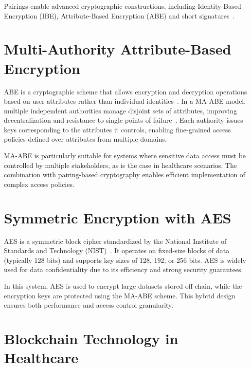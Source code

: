 \documentclass[cic,tc,english]{iiufrgs}
\numberwithin{algorithm}{chapter}
\begin{document}
        Pairings enable advanced cryptographic constructions, including Identity-Based Encryption (IBE), Attribute-Based Encryption (ABE) and short signatures~\citep{boneh2001identity}.

    \section{Multi-Authority Attribute-Based Encryption}
        \label{sec:maabe}
        ABE is a cryptographic scheme that allows encryption and decryption operations based on user attributes rather than individual identities~\citep{goyal2006attribute}. In a MA-ABE model, multiple independent authorities manage disjoint sets of attributes, improving decentralization and resistance to single points of failure~\citep{chase2007multi}. Each authority issues keys corresponding to the attributes it controls, enabling fine-grained access policies defined over attributes from multiple domains.
        
        MA-ABE is particularly suitable for systems where sensitive data access must be controlled by multiple stakeholders, as is the case in healthcare scenarios. The combination with pairing-based cryptography enables efficient implementation of complex access policies.

        
    \section{Symmetric Encryption with AES}
        \label{sec:symmetric}
        AES is a symmetric block cipher standardized by the National Institute of Standards and Technology (NIST)~\citep{daemen1999aes}. It operates on fixed-size blocks of data (typically 128 bits) and supports key sizes of 128, 192, or 256 bits. AES is widely used for data confidentiality due to its efficiency and strong security guarantees.
        
        In this system, AES is used to encrypt large datasets stored off-chain, while the encryption keys are protected using the MA-ABE scheme. This hybrid design ensures both performance and access control granularity.
        
    \section{Blockchain Technology in Healthcare}
        \label{sec:blockchain}
\end{document}
